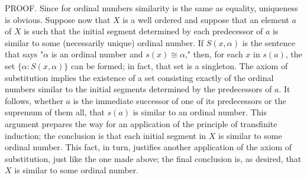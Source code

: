 PROOF. Since for ordinal numbers similarity is the same as equality, uniqueness is obvious. Suppose now that $X$ is a well ordered and suppose that an element $a$ of $X$ is such that the initial segment determined by each predecessor of $a$ is similar to some (necessarily unique) ordinal number. If $S(x, \alpha)$ is the sentence that says "$\alpha$ is an ordinal number and $s(x) \cong \alpha$," then, for each $x$ in $s(a)$, the set $\{ \alpha : S(x, \alpha ) \}$ can be formed; in fact, that set is a singleton. The axiom of substitution implies the existence of a set consisting exactly of the ordinal numbers similar to the initial segments determined by the predecessors of $a$. It follows, whether $a$ is the immediate successor of one of its predecessors or the supremum of them all, that $s(a)$ is similar to an ordinal number. This argument prepares the way for an application of the principle of transfinite induction; the conclusion is that each initial segment in $X$ is similar to some ordinal number. This fact, in turn, justifies another application of the axiom of substitution, just like the one made above; the final conclusion is, as desired, that $X$ is similar to some ordinal number.